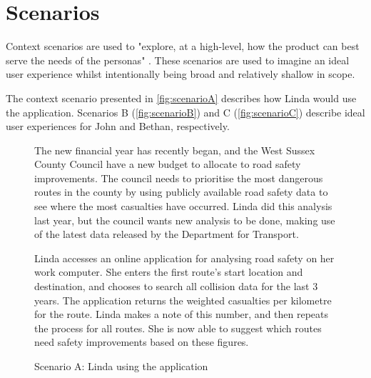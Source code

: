 \documentclass[authoryearcitations]{UoYCSproject}
\begin{document}
\section{Scenarios}

Context scenarios are used to "explore, at a high-level, how the product can best serve the needs of the personas" \citep{Cooper2007}. These scenarios are used to imagine an ideal user experience whilst intentionally being broad and relatively shallow in scope.

The context scenario presented in \autoref{fig:scenarioA} describes how Linda would use the application. Scenarios B (\autoref{fig:scenarioB}) and C (\autoref{fig:scenarioC}) describe ideal user experiences for John and Bethan, respectively.

\begin{figure}
	\begin{framed}
		The new financial year has recently began, and the West Sussex County Council have a new budget to allocate to road safety improvements. The council needs to prioritise the most dangerous routes in the county by using publicly available road safety data to see where the most casualties have occurred. Linda did this analysis last year, but the council wants new analysis to be done, making use of the latest data released by the Department for Transport.
		
		Linda accesses an online application for analysing road safety on her work computer. She enters the first route's start location and destination, and chooses to search all collision data for the last 3 years. The application returns the weighted casualties per kilometre for the route. Linda makes a note of this number, and then repeats the process for all routes. She is now able to suggest which routes need safety improvements based on these figures.
  	\end{framed}
  \caption{Scenario A: Linda using the application}
  \label{fig:scenarioA}
\end{figure}
\end{document}

